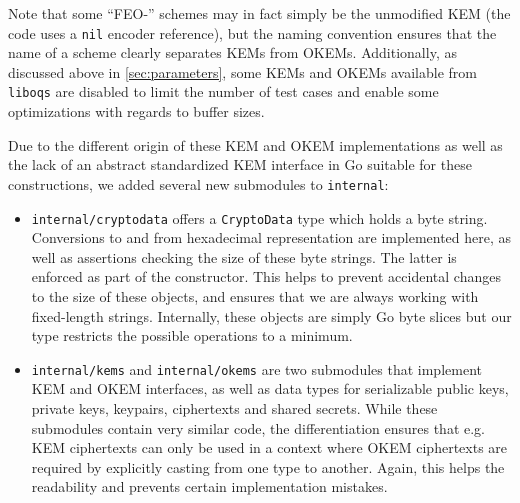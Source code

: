 Note that some ``FEO-'' schemes may in fact simply be the unmodified KEM (the code uses a \texttt{nil} encoder reference), but the naming convention ensures that the name of a scheme clearly separates KEMs from OKEMs. Additionally, as discussed above in \cref{sec:parameters}, some KEMs and OKEMs available from \texttt{liboqs} are disabled to limit the number of test cases and enable some optimizations with regards to buffer sizes.

Due to the different origin of these KEM and OKEM implementations as well as the lack of an abstract standardized KEM interface in Go suitable for these constructions, we added several new submodules to \texttt{internal}:
\begin{itemize}
    \item \texttt{internal/cryptodata} offers a \texttt{CryptoData} type which holds a byte string. Conversions to and from hexadecimal representation are implemented here, as well as assertions checking the size of these byte strings. The latter is enforced as part of the constructor. This helps to prevent accidental changes to the size of these objects, and ensures that we are always working with fixed-length strings. Internally, these objects are simply Go byte slices but our type restricts the possible operations to a minimum.

    \item \texttt{internal/kems} and \texttt{internal/okems} are two submodules that implement KEM and OKEM interfaces, as well as data types for serializable public keys, private keys, keypairs, ciphertexts and shared secrets. While these submodules contain very similar code, the differentiation ensures that e.g. KEM ciphertexts can only be used in a context where OKEM ciphertexts are required by explicitly casting from one type to another. Again, this helps the readability and prevents certain implementation mistakes.


\end{itemize}
